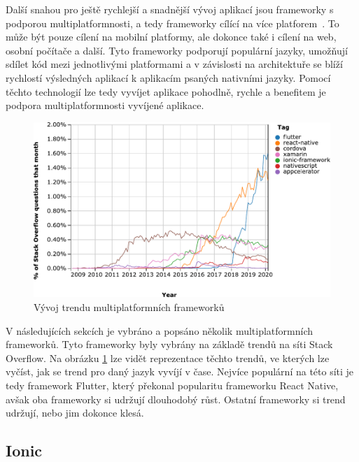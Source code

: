 Další snahou pro ještě rychlejší a snadnější vývoj aplikací jsou frameworky
s podporou multiplatformnosti,
a tedy frameworky cílící na více platforem~\cite{hackernoon_flutter}.
To může být pouze cílení na mobilní platformy,
ale dokonce také i cílení na web, osobní počítače a další.
Tyto frameworky podporují populární jazyky,
umožňují sdílet kód mezi jednotlivými platformami
a v závislosti na architektuře se blíží rychlostí výsledných aplikací
k aplikacím psaných nativními jazyky.
Pomocí těchto technologií lze tedy vyvíjet aplikace pohodlně, rychle
a benefitem  je podpora multiplatformnosti vyvíjené aplikace.
\cite{dashmagazine_mobile_frameworks}

\begin{figure}[ht!]
    \centering
    \includegraphics[width=\linewidth]{assets/technology-research/framework/popularity.pdf}
    \caption{Vývoj trendu multiplatformních frameworků
    \cite{framework_popularity}}
    \label{fig:framework_popularity}
\end{figure}

V následujících sekcích je vybráno a popsáno několik multiplatformních
frameworků.
Tyto frameworky byly vybrány na základě trendů \cite{framework_popularity}
na síti Stack Overflow.
Na obrázku \ref{fig:framework_popularity} lze vidět reprezentace těchto trendů,
ve kterých lze vyčíst,
jak se trend pro daný jazyk vyvíjí v čase.
Nejvíce populární na této síti je tedy framework Flutter,
který překonal popularitu frameworku React Native,
avšak oba frameworky si udržují dlouhodobý růst.
Ostatní frameworky si trend udržují,
nebo jim dokonce klesá.

\subsection{Ionic}

